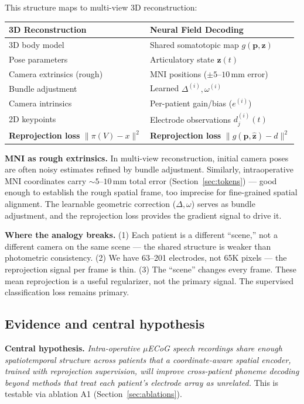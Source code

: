 \documentclass[11pt,letterpaper]{article}
\newcommand{\bfp}{\mathbf{p}}
\newcommand{\bfz}{\mathbf{z}}
\begin{document}
This structure maps to multi-view 3D reconstruction:

\begin{table}[ht!]\centering\small
\begin{tabular}{@{}ll@{}}
\toprule
\textbf{3D Reconstruction} & \textbf{Neural Field Decoding} \\
\midrule
3D body model & Shared somatotopic map $g(\bfp, \bfz)$ \\
Pose parameters & Articulatory state $\bfz(t)$ \\
Camera extrinsics (rough) & MNI positions (${\pm}5$--$10$\,mm error) \\
Bundle adjustment & Learned $\Delta^{(i)}, \omega^{(i)}$ \\
Camera intrinsics & Per-patient gain/bias ($e^{(i)}$) \\
2D keypoints & Electrode observations $d_j^{(i)}(t)$ \\
\textbf{Reprojection loss} $\|\pi(V) - x\|^2$ & \textbf{Reprojection loss} $\|g(\bfp, \hat{\bfz}) - d\|^2$ \\
\bottomrule
\end{tabular}
\end{table}

\textbf{MNI as rough extrinsics.} In multi-view reconstruction, initial camera poses are often noisy estimates refined by bundle adjustment. Similarly, intraoperative MNI coordinates carry ${\sim}5$--$10$\,mm total error (Section~\ref{sec:tokens}) --- good enough to establish the rough spatial frame, too imprecise for fine-grained spatial alignment. The learnable geometric correction ($\Delta, \omega$) serves as bundle adjustment, and the reprojection loss provides the gradient signal to drive it.

\textbf{Where the analogy breaks.} (1) Each patient is a different ``scene,'' not a different camera on the same scene --- the shared structure is weaker than photometric consistency. (2) We have 63--201 electrodes, not 65K pixels --- the reprojection signal per frame is thin. (3) The ``scene'' changes every frame. These mean reprojection is a useful regularizer, not the primary signal. The supervised classification loss remains primary.

\subsection{Evidence and central hypothesis}

\textbf{Central hypothesis.} \textit{Intra-operative $\mu$ECoG speech recordings share enough spatiotemporal structure across patients that a coordinate-aware spatial encoder, trained with reprojection supervision, will improve cross-patient phoneme decoding beyond methods that treat each patient's electrode array as unrelated.} This is testable via ablation A1 (Section~\ref{sec:ablations}).
\end{document}
